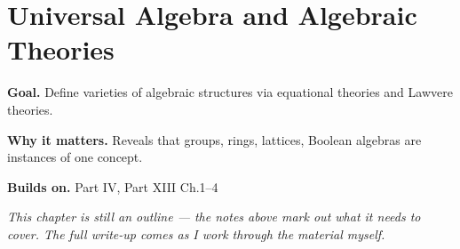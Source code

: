 \chapter{Universal Algebra and Algebraic Theories}
\label{ch:13-category-theory-and-universal-structures-06}

\begin{chapterintro}
\textbf{Goal.} Define varieties of algebraic structures via equational theories and Lawvere theories.

\textbf{Why it matters.} Reveals that groups, rings, lattices, Boolean algebras are instances of one concept.

\textbf{Builds on.} Part IV, Part XIII Ch.1–4
\end{chapterintro}

\textit{This chapter is still an outline --- the notes above mark out what it needs to cover. The full write-up comes as I work through the material myself.}
